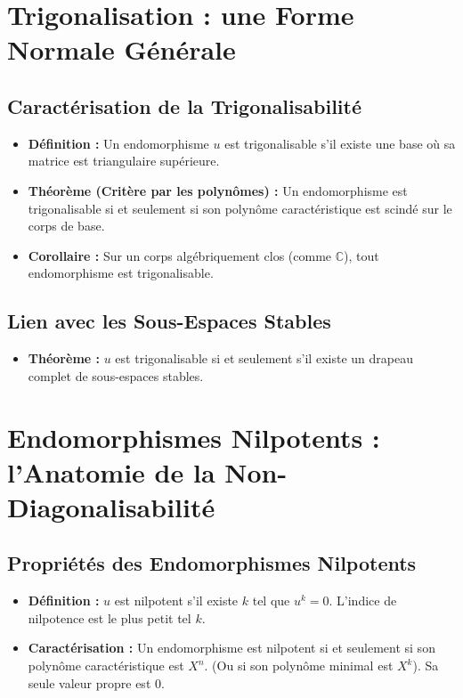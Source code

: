 \documentclass[12pt, a4paper, parskip=full]{report}
\theoremstyle{agregstyle}
\begin{document}
\section{Trigonalisation : une Forme Normale Générale}

\subsection{Caractérisation de la Trigonalisabilité}
\begin{itemize}
    \item \textbf{Définition :} Un endomorphisme $u$ est trigonalisable s'il existe une base où sa matrice est triangulaire supérieure.
    \item \textbf{Théorème (Critère par les polynômes) :} Un endomorphisme est trigonalisable si et seulement si son polynôme caractéristique est scindé sur le corps de base.
    \item \textbf{Corollaire :} Sur un corps algébriquement clos (comme $\mathbb{C}$), tout endomorphisme est trigonalisable.
\end{itemize}

\subsection{Lien avec les Sous-Espaces Stables}
\begin{itemize}
    \item \textbf{Théorème :} $u$ est trigonalisable si et seulement s'il existe un drapeau complet de sous-espaces stables.
\end{itemize}

\section{Endomorphismes Nilpotents : l'Anatomie de la Non-Diagonalisabilité}

\subsection{Propriétés des Endomorphismes Nilpotents}
\begin{itemize}
    \item \textbf{Définition :} $u$ est nilpotent s'il existe $k$ tel que $u^k=0$. L'indice de nilpotence est le plus petit tel $k$.
    \item \textbf{Caractérisation :} Un endomorphisme est nilpotent si et seulement si son polynôme caractéristique est $X^n$. (Ou si son polynôme minimal est $X^k$). Sa seule valeur propre est 0.
\end{itemize}
\end{document}
